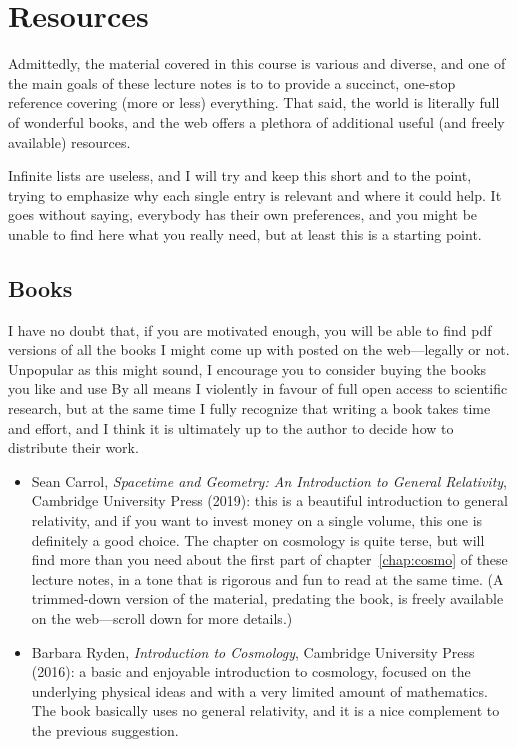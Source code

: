 \chapter*{Resources}

Admittedly, the material covered in this course is various and diverse, and one
of the main goals of these lecture notes is to to provide a succinct, one-stop
reference covering (more or less) everything. That said, the world is literally
full of wonderful books, and the web offers a plethora of additional useful
(and freely available) resources.

Infinite lists are useless, and I will try and keep this short and to the point,
trying to emphasize why each single entry is relevant and where it could help.
It goes without saying, everybody has their own preferences, and you might be unable
to find here what you really need, but at least this is a starting point.


\section*{Books}

I have no doubt that, if you are motivated enough, you will be able to find pdf
versions of all the books I might come up with posted on the web---legally or not.
Unpopular as this might sound, I encourage you to consider buying the books you
like and use
By all means I violently in favour of full open access to scientific research, but
at the same time I fully recognize that writing a book takes time and effort, and
I think it is ultimately up to the author to decide how to distribute their work.

\begin{itemize}
    \item Sean Carrol, \emph{Spacetime and Geometry: An Introduction to General Relativity},
    Cambridge University Press (2019): this is a beautiful introduction to general
    relativity, and if you want to invest money on a single volume, this one is
    definitely a good choice. The chapter on cosmology is quite terse, but will find
    more than you need about the first part of chapter~\ref{chap:cosmo} of these
    lecture notes, in a tone that is rigorous and fun to read at the same time.
    (A trimmed-down version of the material, predating the book, is freely
    available on the web---scroll down for more details.)
    \item Barbara Ryden, \emph{Introduction to Cosmology}, Cambridge University
    Press (2016): a basic and enjoyable introduction to cosmology, focused on the
    underlying physical ideas and with a very limited amount of mathematics. The
    book basically uses no general relativity, and it is a nice complement to the
    previous suggestion.
\end{itemize}



